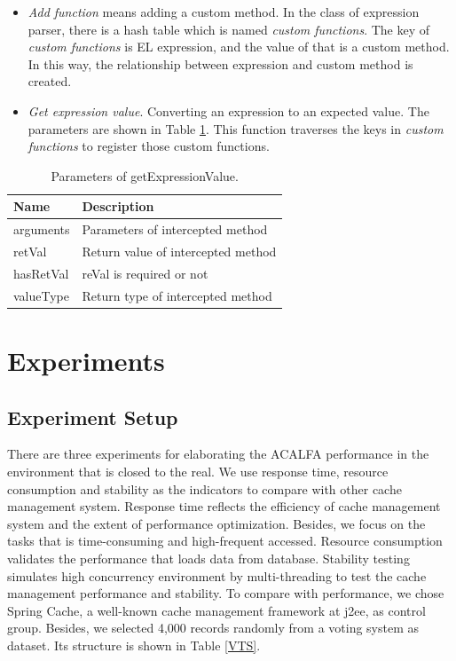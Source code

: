 \documentclass{singlecol-new}
\theoremstyle{TH}{
\newtheorem{lemma}{Lemma}
\newtheorem{theorem}[lemma]{Theorem}
\newtheorem{corrolary}[lemma]{Corrolary}
\newtheorem{conjecture}[lemma]{Conjecture}
\newtheorem{proposition}[lemma]{Proposition}
\newtheorem{claim}[lemma]{Claim}
\newtheorem{stheorem}[lemma]{Wrong Theorem}
}
\theoremstyle{THrm}{
\newtheorem{definition}{Definition}[section]
\newtheorem{question}{Question}[section]
\newtheorem{remark}{Remark}
\newtheorem{scheme}{Scheme}
}
\theoremstyle{THhit}{
\newtheorem{case}{Case}[section]
}
\begin{document}
\begin{itemize}
  \item \textit{Add function} means adding a custom method. In the class of expression parser, there is a hash table which is named \textit{custom functions}. The key of \textit{custom functions} is EL expression, and the value of that is a custom method. In this way, the relationship between expression and custom method is created.
  \item \textit{Get expression value}. Converting an expression to an expected value. The parameters are shown in Table \ref{getExpressionValue}. This function traverses the keys in \textit{custom functions} to register those custom functions.
\end{itemize}

\begin{table}[htb]
\begin{center}
 \caption{\label{getExpressionValue}Parameters of getExpressionValue.}
 \begin{tabular}{ll}
 \toprule
\textbf{Name} & \textbf{Description}\\
 \midrule
arguments & Parameters of intercepted method\\
retVal & Return value of intercepted method\\
hasRetVal & reVal is required or not\\
valueType & Return type of intercepted method\\
\bottomrule
 \end{tabular}
\end{center}
\end{table}

\section{Experiments}
\label{Experiments}

\subsection{Experiment Setup}
There are three experiments for elaborating the ACALFA performance in the environment that is closed to the real. We use response time, resource consumption and stability as the indicators to compare with other cache management system. Response time reflects the efficiency of cache management system and the extent of performance optimization. Besides, we focus on the tasks that is time-consuming and high-frequent accessed. Resource consumption validates the performance that loads data from database. Stability testing simulates high concurrency environment by multi-threading to test the cache management performance and stability. To compare with performance, we chose Spring Cache, a well-known cache management framework at j2ee, as control group. Besides, we selected 4,000 records randomly from a voting system as dataset. Its structure is shown in Table \ref{VTS}.
\end{document}
